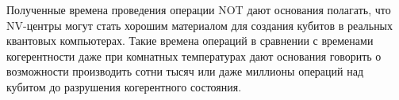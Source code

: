 Полученные времена проведения операции NOT дают основания полагать,
что NV-центры могут стать хорошим материалом для создания кубитов в
реальных квантовых компьютерах. Такие времена операций в сравнении с
временами когерентности даже при комнатных температурах дают основания
говорить о возможности производить сотни тысяч или даже миллионы
операций над кубитом до разрушения когерентного состояния.
